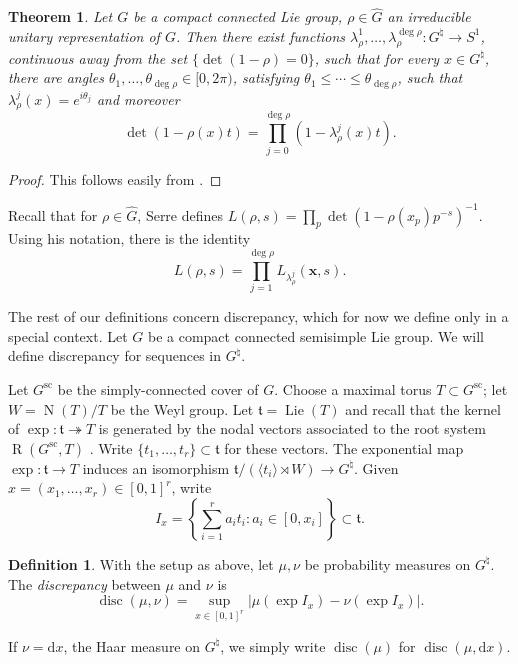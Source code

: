 \documentclass{article}
\DeclareMathOperator{\disc}{disc}
\DeclareMathOperator{\Lie}{Lie}
\DeclareMathOperator{\N}{N}
\DeclareMathOperator{\R}{R}
\newcommand{\bx}{{\boldsymbol x}}
\newcommand{\ft}{\mathfrak{t}}
\newcommand{\dd}{\mathrm{d}}
\newcommand{\simplc}{\mathrm{sc}}
\newtheorem{theorem}[subsection]{Theorem}
\theoremstyle{definition}
\newtheorem{definition}[subsection]{Definition}
\begin{document}
\begin{theorem}
Let $G$ be a compact connected Lie group, $\rho\in\widehat G$ an irreducible 
unitary representation of $G$. Then there exist functions 
$\lambda_\rho^1,\dots,\lambda_\rho^{\deg\rho}\colon G^\natural \to S^1$, 
continuous away from the set $\{\det(1-\rho)=0\}$, such that for every 
$x\in G^\natural$, there are angles 
$\theta_1,\dots,\theta_{\deg\rho}\in [0,2\pi)$, satisfying 
$\theta_1\leqslant \cdots \leqslant \theta_{\deg\rho}$, such that 
$\lambda_\rho^j(x) = e^{i \theta_j}$ and moreover
\[
	\det(1-\rho(x) t) = \prod_{j=0}^{\deg \rho} (1-\lambda_\rho^j(x) t) .
\]
\end{theorem}
\begin{proof}
This follows easily from \cite[Lem.1.0.9]{katz-sarnak-1999}. 
\end{proof}

Recall that for $\rho\in \widehat G$, Serre defines 
$L(\rho,s) = \prod_p \det(1-\rho(x_p) p^{-s})^{-1}$. Using his notation, there 
is the identity 
\[
	L(\rho,s) = \prod_{j=1}^{\deg\rho} L_{\lambda_\rho^j}(\bx,s) .
\]



The rest of our definitions concern discrepancy, which for now we define only 
in a special context. Let $G$ be a compact connected semisimple Lie group. We 
will define discrepancy for sequences in $G^\natural$. 

Let $G^\simplc$ be the simply-connected cover of $G$. Choose a maximal torus 
$T\subset G^\simplc$; let $W=\N(T)/T$ be the Weyl group. Let $\ft=\Lie(T)$ and 
recall that the kernel of $\exp\colon \ft\twoheadrightarrow T$ is generated by 
the nodal vectors associated to the root system $\R(G^\simplc,T)$ 
\cite[9.6 Pr.11]{bourbaki-lie-alg-7-9}. Write $\{t_1,\dots,t_r\}\subset \ft$ 
for these vectors. The exponential map $\exp\colon \ft\to T$ induces an 
isomorphism $\ft/(\langle t_i\rangle \rtimes W) \to G^\natural$.  Given 
$x=(x_1,\dots,x_r)\in [0,1]^r$, write 
\[
	I_x = \left\{\sum_{i=1}^r a_i t_i : a_i \in [0,x_i] \right\} \subset \ft .
\]

\begin{definition}
With the setup as above, let $\mu,\nu$ be probability measures on $G^\natural$. 
The \emph{discrepancy} between $\mu$ and $\nu$ is
\[
	\disc(\mu,\nu) = \sup_{x\in [0,1]^r} \left|\mu(\exp I_x) - \nu(\exp I_x) \right| .
\]
\end{definition}

If $\nu=\dd x$, the Haar measure on $G^\natural$, we simply write 
$\disc(\mu)$ for $\disc(\mu,\dd x)$. 
\end{document}
